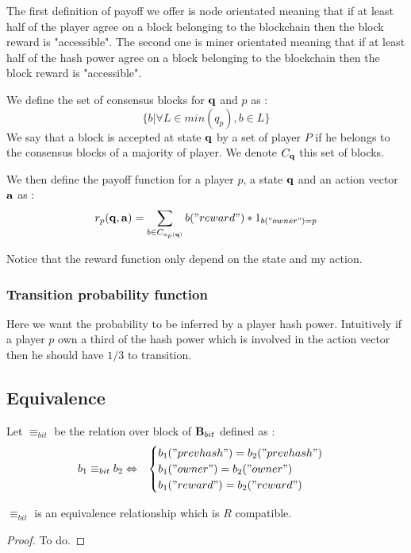 The first definition of payoff we offer is node orientated meaning that if at least half of the player agree on a block belonging to the blockchain then the block reward is "accessible". The second one is miner orientated meaning that if at least half of the hash power agree on a block belonging to the blockchain then the block reward is "accessible".

\begin{mydef}
	We define the set of consensus blocks for $\mathbf{q}$ and $p$ as :
	$$\{b | \forall L \in min(q_p), b \in L  \} $$  
	We say that a block is accepted at state $\mathbf{q}$ by a set of player $P$ if he belongs to the consensus blocks of a majority of player. We denote $C_{\mathbf{q}}$ this set of blocks.
\end{mydef}

We then define the payoff function for a player $p$, a state $\mathbf{q}$ and an action vector $\mathbf{a}$ as : 
$$ r_p(\mathbf{q},\mathbf{a}) = \sum_{b \in C_{a_p(\mathbf{q})}} b("reward") * 1_{b("owner")=p}$$


\begin{myrem}
	Notice that the reward function only depend on the state and my action.
\end{myrem}


\subsubsection{Transition probability function}
Here we want the probability to be inferred by a player hash power. Intuitively if a player $p$ own a third of the hash power which is involved in the action vector then he should have $1/3$ to transition. 


\subsection{Equivalence}

\begin{mydef}
	Let $\equiv_{bit}$ be the relation over block of $\text{\bf B}_{bit}$ defined as : 
	\begin{eqnarray*}
		b_1 \equiv_{bit} b_2 & \Leftrightarrow &
		\begin{cases}
			b_1("prevhash") = b_2("prevhash") \\
			b_1("owner") = b_2("owner") \\
			b_1("reward") = b_2("reward")
		\end{cases}\\
	\end{eqnarray*}
\end{mydef}

\begin{myprop}
	$\equiv_{bit}$ is an equivalence relationship which is $R$ compatible. 
\end{myprop}

\begin{proof}
	To do.
\end{proof}
